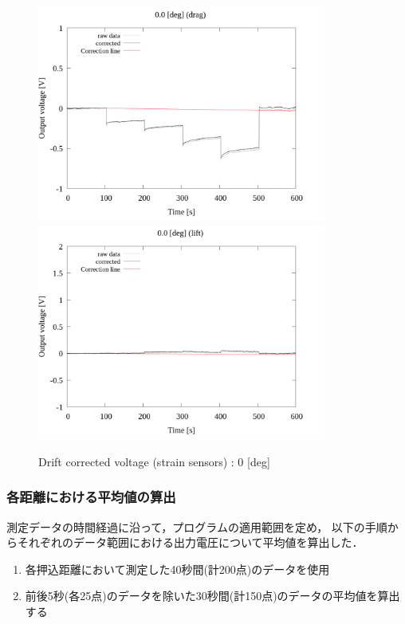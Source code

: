 \begin{figure}[htbp]
  \footnotesize
  \begin{center}
    \includegraphics[width=95mm]{../../02_workspace/result/2-1/plot/02-2_drag/02_drag-drift_0.png}
    \includegraphics[width=95mm]{../../02_workspace/result/2-1/plot/02-3_lift/02_lift-drift_0.png}
    \caption{Drift corrected voltage (strain sensors) : 0 [deg]}
  \end{center}
\end{figure}

\newpage

\subsubsection{各距離における平均値の算出}

測定データの時間経過に沿って，プログラムの適用範囲を定め，
以下の手順からそれぞれのデータ範囲における出力電圧について平均値を算出した．

\begin{enumerate}[(1)]
  \item 各押込距離において測定した40秒間(計200点)のデータを使用
  \item 前後5秒(各25点)のデータを除いた30秒間(計150点)のデータの平均値を算出する
\end{enumerate}

